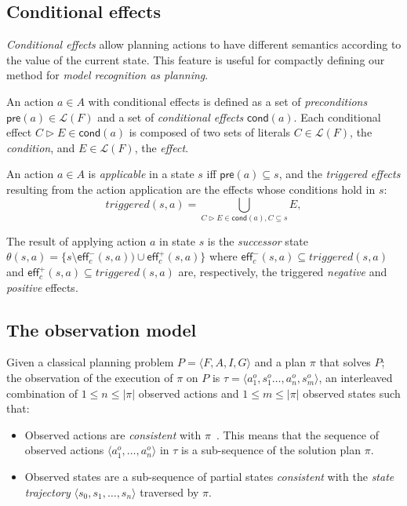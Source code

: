 \documentclass[letterpaper]{article} %
\newcommand{\tup}[1]{{\langle #1 \rangle}}
\newcommand{\pre}{\mathsf{pre}}     %
\newcommand{\eff}{\mathsf{eff}}     %
\newcommand{\cond}{\mathsf{cond}}   %
\begin{document}
\subsection{Conditional effects}
{\em Conditional effects} allow planning actions to have different semantics according to the value of the current state. This feature is useful for compactly defining our method for {\em model recognition as planning}. 

An action $a\in A$ with conditional effects is defined as a set of {\em preconditions} $\pre(a)\in\mathcal{L}(F)$ and a set of {\em conditional effects} $\cond(a)$. Each conditional effect $C\rhd E\in\cond(a)$ is composed of two sets of literals $C\in\mathcal{L}(F)$, the {\em condition}, and $E\in\mathcal{L}(F)$, the {\em effect}.

An action $a\in A$ is {\em applicable} in a state $s$ iff $\pre(a)\subseteq s$, and the {\em triggered effects} resulting from the action application are the effects whose conditions hold in $s$:
\[
triggered(s,a)=\bigcup_{C\rhd E\in\cond(a),C\subseteq s} E,
\]

The result of applying action $a$ in state $s$ is the {\em successor} state $\theta(s,a)=\{s\setminus\eff_c^-(s,a))\cup\eff_c^+(s,a)\}$ where $\eff_c^-(s,a)\subseteq triggered(s,a)$ and $\eff_c^+(s,a)\subseteq triggered(s,a)$ are, respectively, the triggered {\em negative} and {\em positive} effects.

\subsection{The observation model}
Given a classical planning problem $P=\tup{F,A,I,G}$ and a plan $\pi$ that solves $P$; the observation of the execution of  $\pi$ on $P$ is $\tau=\tup{a_1^o,s_1^o \ldots , a_n^o, s_m^o}$, an interleaved combination of {\small $1\leq n\leq |\pi|$} observed actions and {\small $1\leq m\leq |\pi|$} observed states such that:
\begin{itemize}
\item Observed actions are {\em consistent} with $\pi$~\cite{ramirez2009plan}. This means that the sequence of observed actions $\tup{a_1^o, \ldots, a_n^o}$ in $\tau$ is a sub-sequence of the solution plan $\pi$.
\item Observed states are a sub-sequence  of partial states {\em consistent} with the {\em state trajectory} $\tup{s_0, s_1, \ldots, s_n}$ traversed by $\pi$. 
\end{itemize}
\end{document}
